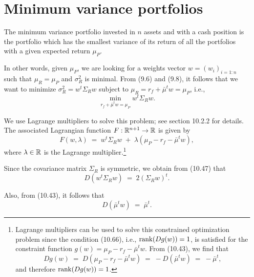 
\section{Minimum variance portfolios}

The minimum variance portfolio invested in $n$ assets and with a cash position is the
portfolio which has the smallest variance of its return of all the portfolios with a
given expected return $\mu_P$.

In other words, given $\mu_P$, we are looking for a weights vector $w = (w_i)_{i=1:n}$
such that $\mu_R = \mu_P$ and $\sigma_R^2$ is minimal. From (9.6) and (9.8), it follows
that we want to minimize $\sigma_R^2 = w^t\Sigma_Rw$ subject to $\mu_R = r_f +
\bar\mu^tw = \mu_P$, i.e.,
\begin{equation}
\min_{r_f+\bar\mu^tw=\mu_P} w^t\Sigma_Rw.
\end{equation}

We use Lagrange multipliers to solve this problem; see section 10.2.2 for details. The
associated Lagrangian function $F : \mathbb{R}^{n+1} \to \mathbb{R}$ is given by
\[
F(w,\lambda) \;=\; w^t\Sigma_Rw \;+\; \lambda(\mu_P-r_f-\bar\mu^tw),
\]
where $\lambda \in \mathbb{R}$ is the Lagrange multiplier.\footnote{Lagrange multipliers can be
used to solve this constrained optimization problem since the condition (10.66), i.e.,
$\operatorname{rank}(Dg(w)) = 1$, is satisfied for the constraint function $g(w) = \mu_P - r_f -
\bar\mu^tw$. From (10.43), we find that
\[
Dg(w) \;=\; D(\mu_P-r_f-\bar\mu^tw) \;=\; -D(\bar\mu^tw) \;=\; -\bar\mu^t,
\]
and therefore $\operatorname{rank}(Dg(w)) = 1$.}

Since the covariance matrix $\Sigma_R$ is symmetric, we obtain from (10.47) that
\begin{equation}
D\left(w^t\Sigma_Rw\right) \;=\; 2\left(\Sigma_Rw\right)^t.
\end{equation}

Also, from (10.43), it follows that
\begin{equation}
D(\bar\mu^tw) \;=\; \bar\mu^t.
\end{equation}

